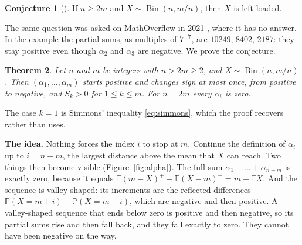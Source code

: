 \documentclass[11pt]{amsart}
\newtheorem{thm}{Theorem}[section]
\theoremstyle{definition}
\newtheorem{conj}[thm]{Conjecture}
\theoremstyle{remark}
\DeclareMathOperator{\Bin}{Bin}
\newcommand{\Prob}{\mathbb P}
\newcommand{\E}{\mathbb E}
\begin{document}
\begin{conj}[{\cite[Conjecture 4.1]{FPP}}]\label{conj}
If $n\ge2m$ and $X\sim\Bin(n,m/n)$, then $X$ is left-loaded.
\end{conj}

The same question was asked on MathOverflow in 2021 \cite{MO}, where it has no answer. In the example the partial
sums, as multiples of $7^{-7}$, are $10249$, $8402$, $2187$: they stay positive even though $\alpha_2$ and $\alpha_3$
are negative. We prove the conjecture.

\begin{thm}\label{thm:main}
Let $n$ and $m$ be integers with $n>2m\ge2$, and $X\sim\Bin(n,m/n)$. Then $(\alpha_1,\dots,\alpha_m)$ starts positive and changes sign at most once,
from positive to negative, and $S_k>0$ for $1\le k\le m$. For $n=2m$ every $\alpha_i$ is zero.
\end{thm}

\noindent The case $k=1$ is Simmons' inequality \eqref{eq:simmons}, which the proof recovers rather than uses.

\medskip\noindent\textbf{The idea.} Nothing forces the index $i$ to stop at $m$. Continue the definition of
$\alpha_i$ up to $i=n-m$, the largest distance above the mean that $X$ can reach. Two things then become visible
(Figure~\ref{fig:alpha}). The full sum $\alpha_1+\dots+\alpha_{n-m}$ is exactly zero, because it equals
$\E(m-X)^+-\E(X-m)^+=m-\E X$. And the sequence is valley-shaped: its increments are the reflected differences
$\Prob(X=m+i)-\Prob(X=m-i)$, which are negative and then positive. A valley-shaped sequence that ends below zero is
positive and then negative, so its partial sums rise and then fall back, and they fall exactly to zero. They cannot
have been negative on the way.
\end{document}
